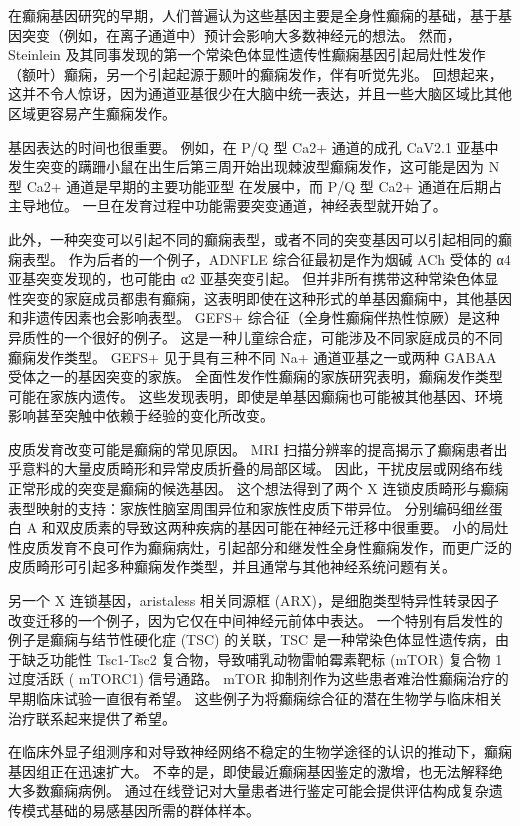 在癫痫基因研究的早期，人们普遍认为这些基因主要是全身性癫痫的基础，基于基因突变（例如，在离子通道中）预计会影响大多数神经元的想法。
然而，Steinlein 及其同事发现的第一个常染色体显性遗传性癫痫基因引起局灶性发作（额叶）癫痫，另一个引起起源于颞叶的癫痫发作，伴有听觉先兆。
回想起来，这并不令人惊讶，因为通道亚基很少在大脑中统一表达，并且一些大脑区域比其他区域更容易产生癫痫发作。


基因表达的时间也很重要。
例如，在 P/Q 型 Ca2+ 通道的成孔 CaV2.1 亚基中发生突变的蹒跚小鼠在出生后第三周开始出现棘波型癫痫发作，这可能是因为 N 型 Ca2+ 通道是早期的主要功能亚型 在发展中，而 P/Q 型 Ca2+ 通道在后期占主导地位。
一旦在发育过程中功能需要突变通道，神经表型就开始了。


此外，一种突变可以引起不同的癫痫表型，或者不同的突变基因可以引起相同的癫痫表型。
作为后者的一个例子，ADNFLE 综合征最初是作为烟碱 ACh 受体的 α4 亚基突变发现的，也可能由 α2 亚基突变引起。
但并非所有携带这种常染色体显性突变的家庭成员都患有癫痫，这表明即使在这种形式的单基因癫痫中，其他基因和非遗传因素也会影响表型。
GEFS+ 综合征（全身性癫痫伴热性惊厥）是这种异质性的一个很好的例子。 这是一种儿童综合症，可能涉及不同家庭成员的不同癫痫发作类型。
GEFS+ 见于具有三种不同 Na+ 通道亚基之一或两种 GABAA 受体之一的基因突变的家族。
全面性发作性癫痫的家族研究表明，癫痫发作类型可能在家族内遗传。
这些发现表明，即使是单基因癫痫也可能被其他基因、环境影响甚至突触中依赖于经验的变化所改变。


皮质发育改变可能是癫痫的常见原因。
MRI 扫描分辨率的提高揭示了癫痫患者出乎意料的大量皮质畸形和异常皮质折叠的局部区域。
因此，干扰皮层或网络布线正常形成的突变是癫痫的候选基因。
这个想法得到了两个 X 连锁皮质畸形与癫痫表型映射的支持：家族性脑室周围异位和家族性皮质下带异位。
分别编码细丝蛋白 A 和双皮质素的导致这两种疾病的基因可能在神经元迁移中很重要。
小的局灶性皮质发育不良可作为癫痫病灶，引起部分和继发性全身性癫痫发作，而更广泛的皮质畸形可引起多种癫痫发作类型，并且通常与其他神经系统问题有关。


另一个 X 连锁基因，aristaless 相关同源框 (ARX)，是细胞类型特异性转录因子改变迁移的一个例子，因为它仅在中间神经元前体中表达。
一个特别有启发性的例子是癫痫与结节性硬化症 (TSC) 的关联，TSC 是一种常染色体显性遗传病，由于缺乏功能性 Tsc1-Tsc2 复合物，导致哺乳动物雷帕霉素靶标 (mTOR) 复合物 1 过度活跃 ( mTORC1) 信号通路。
mTOR 抑制剂作为这些患者难治性癫痫治疗的早期临床试验一直很有希望。
这些例子为将癫痫综合征的潜在生物学与临床相关治疗联系起来提供了希望。


在临床外显子组测序和对导致神经网络不稳定的生物学途径的认识的推动下，癫痫基因组正在迅速扩大。
不幸的是，即使最近癫痫基因鉴定的激增，也无法解释绝大多数癫痫病例。
通过在线登记对大量患者进行鉴定可能会提供评估构成复杂遗传模式基础的易感基因所需的群体样本。



